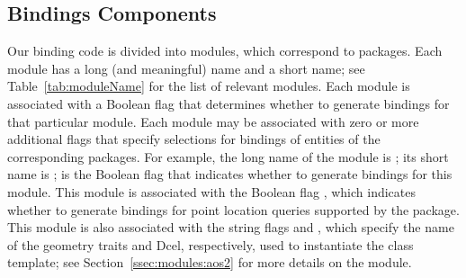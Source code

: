 \subsection{Bindings Components}
\label{sec:gen:components}
Our binding code is divided into modules, which correspond to \cgal{} packages.  Each module has a long (and meaningful) name and a short name; see Table~\ref{tab:moduleName} for the list of relevant modules. Each module is associated with a \cmake{} Boolean flag that determines whether to generate bindings for that particular module. Each module may be associated with zero or more additional flags that specify selections for bindings of entities of the corresponding \cgal{} packages.  For example, the long name of the \iiDArrangementsPackage{} module is ; its short name is ;  is the Boolean flag that indicates whether to generate bindings for this module.  This module is associated with the Boolean flag , which indicates whether to generate bindings for point location queries supported by the \iiDArrangementsPackage{} package. This module is also associated with the string flags  and , which specify the name of the geometry traits and Dcel, respectively, used to instantiate the
 class template; see Section~\ref{ssec:modules:aos2} for more details on the \iiDArrangementsPackage{} module.

